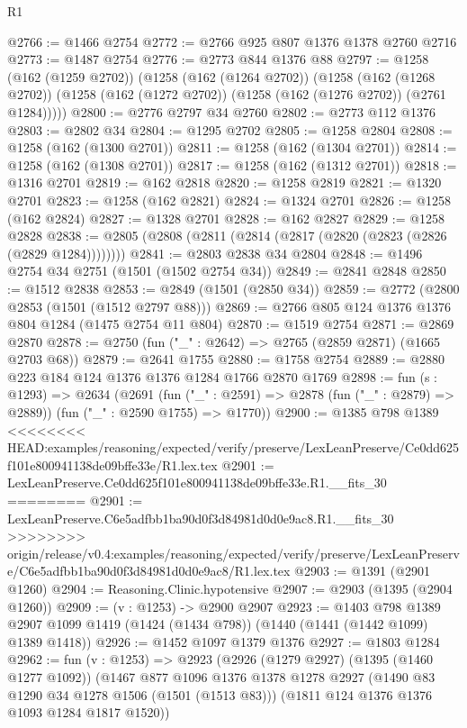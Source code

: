 \begin{lexlean}{R1}
\begin{coremodule}
{{{{{{{{{{{{{{{{{{{{{{{{{{{{{{{{{{{{{{{{{{{{{{{{{{{{{{{{{{{{{{{{{{{{{{{{{{{{{{{{{{{{{{{{{{@2766 := @1466 @2754
@2772 := @2766 @925 @807 @1376 @1378 @2760 @2716
@2773 := @1487 @2754
@2776 := @2773 @844 @1376 @88
@2797 := @1258
    (@162 (@1259 @2702))
    (@1258
      (@162 (@1264 @2702))
      (@1258
        (@162 (@1268 @2702))
        (@1258 (@162 (@1272 @2702)) (@1258 (@162 (@1276 @2702)) (@2761 @1284)))))
@2800 := @2776 @2797 @34 @2760
@2802 := @2773 @112 @1376
@2803 := @2802 @34
@2804 := @1295 @2702
@2805 := @1258 @2804
@2808 := @1258 (@162 (@1300 @2701))
@2811 := @1258 (@162 (@1304 @2701))
@2814 := @1258 (@162 (@1308 @2701))
@2817 := @1258 (@162 (@1312 @2701))
@2818 := @1316 @2701
@2819 := @162 @2818
@2820 := @1258 @2819
@2821 := @1320 @2701
@2823 := @1258 (@162 @2821)
@2824 := @1324 @2701
@2826 := @1258 (@162 @2824)
@2827 := @1328 @2701
@2828 := @162 @2827
@2829 := @1258 @2828
@2838 := @2805 (@2808 (@2811 (@2814 (@2817 (@2820 (@2823 (@2826 (@2829 @1284))))))))
@2841 := @2803 @2838 @34 @2804
@2848 := @1496 @2754 @34 @2751 (@1501 (@1502 @2754 @34))
@2849 := @2841 @2848
@2850 := @1512 @2838
@2853 := @2849 (@1501 (@2850 @34))
@2859 := @2772 (@2800 @2853 (@1501 (@1512 @2797 @88)))
@2869 := @2766 @805 @124 @1376 @1376 @804 @1284 (@1475 @2754 @11 @804)
@2870 := @1519 @2754
@2871 := @2869 @2870
@2878 := @2750 (fun ("_" : @2642) => @2765 (@2859 @2871) (@1665 @2703 @68))
@2879 := @2641 @1755
@2880 := @1758 @2754
@2889 := @2880 @223 @184 @124 @1376 @1376 @1284 @1766 @2870 @1769
@2898 := fun (s : @1293) =>
  @2634
    (@2691
      (fun ("_" : @2591) => @2878 (fun ("_" : @2879) => @2889))
      (fun ("_" : @2590 @1755) => @1770))
@2900 := @1385 @798 @1389
<<<<<<<< HEAD:examples/reasoning/expected/verify/preserve/LexLeanPreserve/Ce0dd625f101e800941138de09bffe33e/R1.lex.tex
@2901 := LexLeanPreserve.Ce0dd625f101e800941138de09bffe33e.R1.__fits_30
========
@2901 := LexLeanPreserve.C6e5adfbb1ba90d0f3d84981d0d0e9ac8.R1.__fits_30
>>>>>>>> origin/release/v0.4:examples/reasoning/expected/verify/preserve/LexLeanPreserve/C6e5adfbb1ba90d0f3d84981d0d0e9ac8/R1.lex.tex
@2903 := @1391 (@2901 @1260)
@2904 := Reasoning.Clinic.hypotensive
@2907 := @2903 (@1395 (@2904 @1260))
@2909 := (v : @1253) -> @2900 @2907
@2923 := @1403
    @798
    @1389
    @2907
    @1099
    @1419
    (@1424 (@1434 @798))
    (@1440 (@1441 (@1442 @1099) @1389 @1418))
@2926 := @1452 @1097 @1379 @1376
@2927 := @1803 @1284
@2962 := fun (v : @1253) =>
  @2923
    (@2926
      (@1279 @2927)
      (@1395 (@1460 @1277 @1092))
      (@1467
        @877
        @1096
        @1376
        @1378
        @1278
        @2927
        (@1490 @83 @1290 @34 @1278 @1506 (@1501 (@1513 @83)))
        (@1811 @124 @1376 @1376 @1093 @1284 @1817 @1520))
}}}}}}}}}}}}}}}}}}}}}}}}}}}}}}}}}}}}}}}}}}}}}}}}}}}}}}}}}}}}}}}}}}}}}}}}}}}}}}}}}}}}}}}}}}
\end{coremodule}
\end{lexlean}
